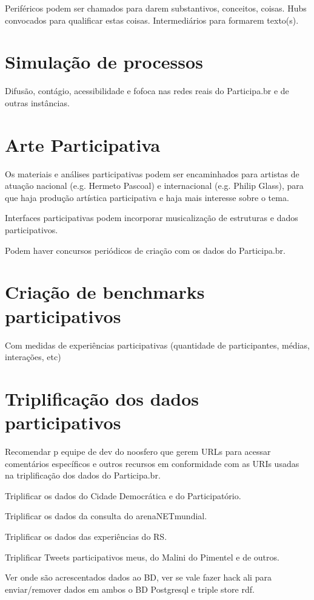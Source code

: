 \documentclass[12pt]{report}
\begin{document}
Periféricos podem ser chamados para darem substantivos, conceitos, coisas.
Hubs convocados para qualificar estas coisas. Intermediários para formarem texto(s).
\chapter{Simulação de processos}

Difusão, contágio, acessibilidade e fofoca nas redes reais do Participa.br e de outras instâncias.

\chapter{Arte Participativa}
Os materiais e análises participativas podem ser encaminhados para artistas de atuação nacional (e.g. Hermeto Pascoal) e internacional (e.g. Philip Glass), para que haja produção artística participativa e haja mais interesse sobre o tema.

Interfaces participativas podem incorporar musicalização de estruturas e dados participativos.

Podem haver concursos periódicos de criação com os dados do Participa.br.
\chapter{Criação de benchmarks participativos}
Com medidas de experiências participativas (quantidade de participantes, médias, interações, etc)

\chapter{Triplificação dos dados participativos}
Recomendar p equipe de dev do noosfero que gerem URLs para acessar comentários específicos e outros recursos em conformidade com as URIs usadas na triplificação dos dados do Participa.br.

Triplificar os dados do Cidade Democrática e do Participatório.

Triplificar os dados da consulta do arenaNETmundial.

Triplificar os dados das experiências do RS.

Triplificar Tweets participativos meus, do Malini do Pimentel e de outros.

Ver onde são acrescentados dados ao BD, ver se vale fazer hack ali para enviar/remover dados em ambos o BD Postgresql e triple store rdf.
\end{document}
